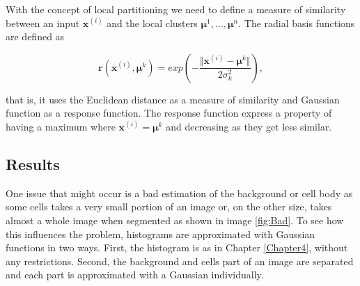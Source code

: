 With the concept of local partitioning we need to define a measure of similarity between an input $\mathbf{x}^{(i)}$ and the local clusters $\boldsymbol \mu^1, \ldots, \boldsymbol \mu^n$. The radial basis functions are defined as

\begin{equation}
	\mathbf{r}(\mathbf{x}^{(i)}, \boldsymbol \mu^k) = exp \left (- \frac{\Vert \mathbf{x}^{(i)}  - \boldsymbol \mu^k \Vert}{2\sigma_k^2} \right ),
\end{equation} 

that is, it uses the Euclidean distance as a measure of similarity and Gaussian function as a response function. The response function express a property of having a maximum where $\mathbf{x}^{(i)} = \boldsymbol \mu^k$ and decreasing as they get less similar. 





\subsection{Results}

One issue that might occur is a bad estimation of the background or cell body as some cells takes a very small portion of an image or, on the other size, takes almost a whole image when segmented as shown in image \ref{fig:Bad}. To see how this influences the problem, histograms are approximated with Gaussian functions in two ways. First, the histogram is as in Chapter \ref{Chapter4}, without any restrictions. Second, the background and cells part of an image are separated and each part is approximated with a Gaussian individually. \\

